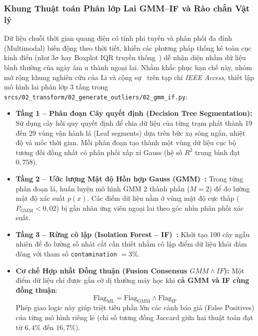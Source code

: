 \documentclass[12pt, a4paper]{report}
\begin{document}
\subsubsection{Khung Thuật toán Phân lớp Lai GMM--IF và Rào chắn Vật lý}
Dữ liệu chuỗi thời gian quang điện có tính phi tuyến và phân phối đa đỉnh (Multimodal) biến động theo thời tiết, khiến các phương pháp thống kê toàn cục kinh điển (như $3\sigma$ hay Boxplot IQR truyền thống~\cite{tukey1977eda}) dễ nhận diện nhầm dữ liệu bình thường của ngày âm u thành ngoại lai. Nhằm khắc phục hạn chế này, nhóm mở rộng khung nghiên cứu của Li và cộng sự~\cite{li2025gmmif} trên tạp chí \textit{IEEE Access}, thiết lập mô hình lai phân lớp 3 tầng trong \texttt{srcs/02\_transform/02\_generate\_outliers/02\_gmm\_if.py}:

\begin{itemize}
    \item \textbf{Tầng 1 -- Phân đoạn Cây quyết định (Decision Tree Segmentation):} Sử dụng cây hồi quy quyết định để chia dữ liệu của từng trạm phát thành 19 đến 29 vùng vận hành lá (Leaf segments) dựa trên bức xạ sóng ngắn, nhiệt độ và mốc thời gian. Mỗi phân đoạn tạo thành một vùng dữ liệu cục bộ tương đối đồng nhất có phân phối xấp xỉ Gauss (hệ số $R^2$ trung bình đạt $0{,}758$).
    \item \textbf{Tầng 2 -- Ước lượng Mật độ Hỗn hợp Gauss (GMM)~\cite{bishop2006pattern}:} Trong từng phân đoạn lá, huấn luyện mô hình GMM 2 thành phần ($M = 2$) để đo lường mật độ xác suất $p(x)$. Các điểm dữ liệu nằm ở vùng mật độ cực thấp ($P_{\text{GMM}} < 0{,}02$) bị gắn nhãn ứng viên ngoại lai theo góc nhìn phân phối xác suất.
    \item \textbf{Tầng 3 -- Rừng cô lập (Isolation Forest -- IF)~\cite{liu2008isolation}:} Khởi tạo 100 cây ngẫu nhiên để đo lường số nhát cắt cần thiết nhằm cô lập điểm dữ liệu khỏi đám đông với tham số \texttt{contamination} $= 3\%$.
    \item \textbf{Cơ chế Hợp nhất Đồng thuận (Fusion Consensus $GMM \wedge IF$):} Một điểm dữ liệu chỉ được gắn cờ dị thường máy học khi \textbf{cả GMM và IF cùng đồng thuận}:
    \begin{equation}
        \text{Flag}_{\text{ML}} = \text{Flag}_{\text{GMM}} \wedge \text{Flag}_{\text{IF}}
    \end{equation}
    Phép giao logic này giúp triệt tiêu phần lớn các cảnh báo giả (False Positives) của từng mô hình riêng lẻ (chỉ số tương đồng Jaccard giữa hai thuật toán đạt từ $6{,}4\%$ đến $16{,}7\%$).
\end{itemize}
\end{document}

